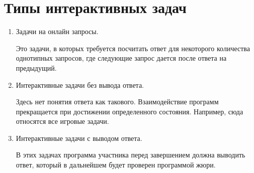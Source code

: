 



\section{Типы интерактивных задач}
\begin{enumerate}
    \item Задачи на онлайн запросы.

    Это задачи, в которых требуется посчитать ответ для некоторого количества однотипных запросов, где следующие запрос дается после ответа на предыдущий.

    \item Интерактивные задачи без вывода ответа.

    Здесь нет понятия ответа как такового. Взаимодействие программ прекращается при достижении определенного состояния. Например, сюда относятся все игровые задачи.

    \item Интерактивные задачи с выводом ответа.

    В этих задачах программа участника перед завершением должна выводить ответ, который в дальнейшем будет проверен программой жюри.
\end{enumerate}

